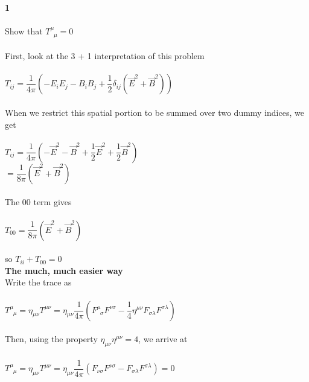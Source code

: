 \documentclass[prb,preprint]
{revtex4-1}
\begin{document}
\textbf{1}
\\
\\
Show that $T^\mu_{\;\;\mu} = 0$
\\
\\
First, look at the 3 + 1 interpretation of this problem
\\
\\
$T_{ij} = \dfrac{1}{4\pi}\left(-E_iE_j - B_iB_j + \dfrac{1}{2}\delta_{ij}\left(\vec{E}^2 + \vec{B}^2\right)\right)$
\\
\\
When we restrict this spatial portion to be summed over two dummy indices, we get
\\
\\
$T_{ij} = \dfrac{1}{4\pi}\left(-\vec{E}^2 - \vec{B}^2 + \dfrac{1}{2}\vec{E}^2 + \dfrac{1}{2}\vec{B}^2\right)$
\\
$= \dfrac{1}{8\pi}\left(\vec{E}^2 + \vec{B}^2\right)$
\\
\\
The $00$ term gives
\\
\\
$T_00 = \dfrac{1}{8\pi}\left(\vec{E}^2 + \vec{B}^2\right)$
\\
\\
so
$T_{ii} + T_{00} = 0$
\\
\textbf{The much, much easier way}
\\
Write the trace as
\\
\\
$T_{\;\;\mu}^\mu= \eta_{\mu\nu}T^{\mu\nu} = \eta_{\mu\nu}\dfrac{1}{4\pi}\left(F^\mu_{\;\;\sigma} F^{\nu\sigma}-\dfrac{1}{4}\eta^{\mu\nu}F_{\sigma\lambda}F^{\sigma\lambda}\right)$
\\
\\
Then, using the property $\eta_{\mu\nu}\eta^{\mu\nu} = 4$, we arrive at 
\\
\\
$T_{\;\;\mu}^\mu= \eta_{\mu\nu}T^{\mu\nu} = \eta_{\mu\nu}\dfrac{1}{4\pi}\left(F_{\nu\sigma} F^{\nu\sigma}-F_{\sigma\lambda}F^{\sigma\lambda}\right) = 0$
\\
\\
\end{document}
